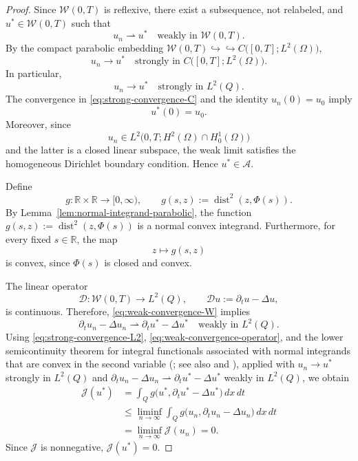 \documentclass[11pt]{elsarticle}
\theoremstyle{definition}
\theoremstyle{remark}
\numberwithin{equation}{section}
\begin{document}
\begin{proof}
		Since $\mathcal{W}(0,T)$ is reflexive, there exist a subsequence,
		not relabeled, and $u^\ast\in\mathcal{W}(0,T)$ such that
		\begin{equation}
		u_n\rightharpoonup u^\ast
		\quad\text{weakly in }\mathcal{W}(0,T).
		\label{eq:weak-convergence-W}
		\end{equation}
		By the compact parabolic embedding	$\mathcal{W}(0,T)
		\hookrightarrow\hookrightarrow
		C\bigl([0,T];L^2(\Omega)\bigr),
		$
		\begin{equation}
		u_n\longrightarrow u^\ast
		\quad\text{strongly in }
		C\bigl([0,T];L^2(\Omega)\bigr).
		\label{eq:strong-convergence-C}
		\end{equation}
		In particular,
		\begin{equation}
		u_n\longrightarrow u^\ast
		\quad\text{strongly in }L^2(Q).
		\label{eq:strong-convergence-L2}
		\end{equation}
		The convergence in \eqref{eq:strong-convergence-C} and the identity
		$u_n(0)=u_0$ imply
		\[
		u^\ast(0)=u_0.
		\]
		Moreover, since
		\[
		u_n\in L^2\bigl(0,T;H^2(\Omega)\cap H_0^1(\Omega)\bigr)
		\]
		and the latter is a closed linear subspace, the weak limit satisfies
		the homogeneous Dirichlet boundary condition. Hence
		$u^\ast\in\mathcal{A}$.
		
		Define
		\[
		g:\mathbb{R}\times\mathbb{R}\longrightarrow[0,\infty),
		\qquad
		g(s,z):=\operatorname{dist}^2(z,\Phi(s)).
		\]
		By Lemma~\ref{lem:normal-integrand-parabolic}, the function
		$g(s,z):=\operatorname{dist}^2(z,\Phi(s))$ is a normal convex integrand. Furthermore, for every fixed $s\in\mathbb{R}$,
		the map
		\[
		z\longmapsto g(s,z)
		\]
		is convex, since $\Phi(s)$ is closed and convex.
		
		The linear operator
		\[
		\mathcal{D}:
		\mathcal{W}(0,T)\longrightarrow L^2(Q),
		\qquad
		\mathcal{D}u:=\partial_tu-\Delta u,
		\]
		is continuous. Therefore, \eqref{eq:weak-convergence-W} implies
		\begin{equation}
		\partial_tu_n-\Delta u_n
		\rightharpoonup
		\partial_tu^\ast-\Delta u^\ast
		\quad\text{weakly in }L^2(Q).
		\label{eq:weak-convergence-operator}
		\end{equation}
		Using \eqref{eq:strong-convergence-L2}, \eqref{eq:weak-convergence-operator}, and the lower
		semicontinuity theorem for integral functionals associated with
		normal integrands that are convex in the second variable
		(\cite[Theorem~1]{berkovitz_1974}; see also \cite{ioffe_1977} and
		\cite[Chapter~VIII]{ekeland_temam_1999}), applied with
		$u_n\to u^\ast$ strongly in $L^2(Q)$ and
		$\partial_t u_n-\Delta u_n\rightharpoonup\partial_t u^\ast-\Delta u^\ast$
		weakly in $L^2(Q)$, we obtain
		\[
		\begin{aligned}
			\mathcal{J}(u^\ast)
			&=
			\int_Q
			g\bigl(
			u^\ast,
			\partial_tu^\ast-\Delta u^\ast
			\bigr)\,dx\,dt
			\\
			&\leq
			\liminf_{n\to\infty}
			\int_Q
			g\bigl(
			u_n,
			\partial_tu_n-\Delta u_n
			\bigr)\,dx\,dt
			\\
			&=
			\liminf_{n\to\infty}
			\mathcal{J}(u_n)
			=
			0.
		\end{aligned}
		\]
		Since $\mathcal{J}$ is nonnegative, $\mathcal{J}(u^\ast)=0$. 
		

\end{proof}
\end{document}
